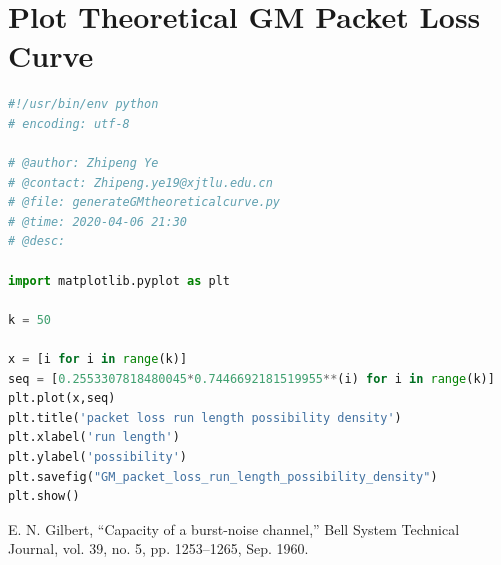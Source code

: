 \documentclass[11pt]{article}
\begin{document}
\section{Plot Theoretical GM Packet Loss Curve}\label{TPLC}
\begin{lstlisting}[language=Python]
    #!/usr/bin/env python
# encoding: utf-8

# @author: Zhipeng Ye
# @contact: Zhipeng.ye19@xjtlu.edu.cn
# @file: generateGMtheoreticalcurve.py
# @time: 2020-04-06 21:30
# @desc:

import matplotlib.pyplot as plt

k = 50

x = [i for i in range(k)]
seq = [0.2553307818480045*0.7446692181519955**(i) for i in range(k)]
plt.plot(x,seq)
plt.title('packet loss run length possibility density')
plt.xlabel('run length')
plt.ylabel('possibility')
plt.savefig("GM_packet_loss_run_length_possibility_density")
plt.show()

\end{lstlisting}
\newpage
\begin{thebibliography}{9}
E. N. Gilbert, “Capacity of a burst-noise channel,” Bell System Technical Journal, vol. 39, no. 5, pp. 1253–1265, Sep. 1960.
\end{thebibliography}
\end{document}
